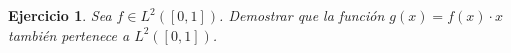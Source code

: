 \documentclass[11pt]{report}
\newtheorem{ex}{Ejercicio}
\newenvironment{solution}{\begin{proof}[Solución]}{\end{proof}}
\newcommand{\inner}[2]{( #1, #2 )_V}
\newcommand{\Ldos}{L^2}
\begin{document}



\begin{ex}
Sea $f \in \Ldos([0, 1])$. Demostrar que la función $g(x) = f(x) \cdot x$ también pertenece a $\Ldos([0, 1])$.
\end{ex}




\end{document}
